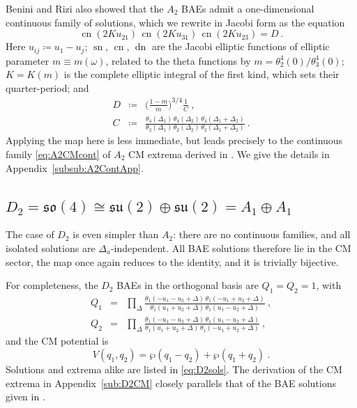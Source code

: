 \documentclass[aps, prx, nofootinbib, twocolumn,amsfonts,amsmath,amssymb,mathtools,superscriptaddress,preprintnumbers,floatfix,reprint]{revtex4-2}
\DeclareMathOperator{\sn}{sn}
\DeclareMathOperator{\cn}{cn}
\DeclareMathOperator{\dn}{dn}
\begin{document}
Benini and Rizi also showed \cite{Benini:2021ano} that the $A_2$ BAEs admit a
one-dimensional continuous family of solutions, which we rewrite in Jacobi form as the equation
\begin{equation}\label{eq:A2BAEcont}
  \cn(2Ku_{21})\,\cn(2Ku_{31})\,\cn(2Ku_{23})=D\ .
\end{equation}
Here $u_{ij}\coloneqq u_1-u_j$; $\sn$, $\cn$, $\dn$ are the Jacobi elliptic functions of elliptic parameter
$m\equiv m(\omega)$, related to the theta functions by
$m=\theta_2^4(0)/\theta_3^4(0)$; $K=K(m)$ is the complete elliptic integral
of the first kind, which sets their quarter-period; and 
\begin{subequations}\label{eq:D}
\begin{eqnarray}
  D&\coloneqq&\Big(\frac{1-m}{m}\Big)^{3/4}\frac{1}{C}\ , \\
  C&\coloneqq&\frac{\theta_4(\Delta_1)\,\theta_4(\Delta_2)\,\theta_4(\Delta_1+\Delta_2)}
  {\theta_2(\Delta_1)\,\theta_2(\Delta_2)\,\theta_2(\Delta_1+\Delta_2)}\ .  
\end{eqnarray}
\end{subequations}
Applying the map here is less immediate, but leads precisely to the continuous
family \eqref{eq:A2CMcont} of $A_2$ CM extrema derived in
\cite[Sec. 4.2]{Bourget:2015upj}. We give the details in
Appendix~\ref{subsub:A2ContApp}.

\subsection{\texorpdfstring{$D_2=\mathfrak{so}(4) \cong \mathfrak{su}(2)\oplus \mathfrak{su}(2)=A_1\oplus A_1$}{D2=so(4)=su(2)+su(2)=A1+A1}}
\label{sub:D2}

The case of $D_2$ is even simpler than $A_2$: there are no continuous families,
and all isolated solutions are $\Delta_a$-independent. All BAE solutions
therefore lie in the CM sector, the map once again reduces to the identity, and it
is trivially bijective.

For completeness, the $D_2$ BAEs in the orthogonal basis are $Q_1=Q_2=1$, with
\begin{subequations}
\begin{eqnarray}
  Q_1&=&\prod_{\Delta}
  \frac{\theta_1(-u_1-u_2+\Delta)\,\theta_1(-u_1+u_2+\Delta)}
  {\theta_1(u_1+u_2+\Delta)\,\theta_1(u_1-u_2+\Delta)}\ ,\\
  Q_2&=&\prod_{\Delta}
  \frac{\theta_1(-u_1-u_2+\Delta)\,\theta_1(u_1-u_2+\Delta)}
  {\theta_1(u_1+u_2+\Delta)\,\theta_1(-u_1+u_2+\Delta)}\ ,
\end{eqnarray}
\end{subequations}
and the CM potential is
\begin{equation}\label{eq:D2pot}
  V(q_1,q_2)=\wp(q_1-q_2)+\wp(q_1+q_2)\ .
\end{equation}
Solutions and extrema alike are listed in \eqref{eq:D2sols}. The derivation of
the CM extrema in Appendix~\ref{sub:D2CM} closely parallels that of the BAE
solutions given in \cite{B2paper}.
\end{document}
